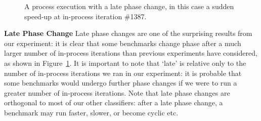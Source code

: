 \documentclass[a4paper,UKenglish]{lipics}
\begin{document}
\begin{figure}[tbp]
\caption{A process execution with a late phase change, in this case a sudden
speed-up at in-process iteration \#1387.}
\label{fig:examples:late1}
\end{figure}

\textbf{Late Phase Change} \label{sub:phase}
Late phase changes are one of the surprising results from our experiment: it is
clear that some benchmarks change phase after a much larger number of in-process iterations
than previous experiments have considered, as shown in Figure~\ref{fig:examples:late1}.
It is important to note that `late' is relative only to the number of in-process
iterations we ran in our experiment: it is probable that some benchmarks would
undergo further phase changes if we were to run a greater number of in-process
iterations. Note that late phase changes are orthogonal to most of our other
classifiers: after a late phase change, a benchmark may run faster, slower, or
become cyclic etc.
\end{document}
